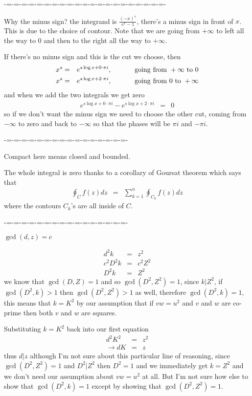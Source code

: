 \documentclass[aps,preprint,preprintnumbers,nofootinbib,showpacs,prd]{revtex4-1}
\newcommand{\nbea}{\begin{eqnarray*}}
\newcommand{\neea}{\end{eqnarray*}}
\begin{document}
-=-=-=-=-=-=-=-=-=-=-=-=-=-=-=-=-=-=-=-=-=-

Why the minus sign? the integrand is $\frac{(-x)^s}{e^x - 1}$, there's a minus sign in front of $x$. This is due to the choice of contour. Note that we are going from $+\infty$ to left all the way to 0 and then to the right all the way to $+\infty$.

If there's no minus sign and this is the cut we choose, then
%
\nbea
x^s & = & e^{s\log x + 0\cdot\pi i} , ~~~~~~~~~~ {\rm going~from~} +\infty {\rm ~to~} 0 \\
x^s & = & e^{s\log x + 2\cdot\pi i} , ~~~~~~~~~~ {\rm going~from~} 0 {\rm ~to~} +\infty
\neea
% 
and when we add the two integrals we get zero
%
\nbea
e^{s\log x + 0\cdot\pi i} - e^{s\log x + 2\cdot\pi i} & = & 0
\neea
%
so if we don't want the minus sign we need to choose the other cut, coming from $-\infty$ to zero and back to $-\infty$ so that the phases will be $\pi i$ and $-\pi i$.

-=-=-=-=-=-=-=-=-=-=-=-=-=-=-=-=-

Compact here means closed and bounded.

The whole integral is zero thanks to a corollary of Goursat theorem which says that
%
\nbea
\oint_C f(z) dz & = & \sum_{k=1}^n \oint_{C_k} f(z) dz
\neea
%
where the contours $C_k$'s are all inside of $C$.


-=-=-=-=-=-=-=-=-=-=-=-=-=-=-=-=-

$\gcd(d,z) = c$

%
\nbea
d^2 k & = & z^2 \\
c^2 D^2 k & = & c^2 Z^2 \\
D^2 k & = & Z^2
\neea
%
we know that $\gcd(D,Z) = 1$ and so $\gcd(D^2,Z^2) = 1$, since $k|Z^2$, if $\gcd(D^2,k) > 1$ then $\gcd(D^2,Z^2) > 1$ as well, therefore $\gcd(D^2,k) = 1$, this means that $k = K^2$ by our assumption that if $vw = u^2$ and $v$ and $w$ are co-prime then both $v$ and $w$ are squares.

Substituting $k=K^2$ back into our first equation
%
\nbea
d^2K^2 & = & z^2 \\
\to dK & = & z
\neea
%
thus $d|z$ although I'm not sure about this particular line of reasoning, since $\gcd(D^2,Z^2) = 1$ and $D^2|Z^2$ then $D^2 = 1$ and we immediately get $k=Z^2$ and we don't need our assumption about $vw=u^2$ at all. But I'm not sure how else to show that $\gcd(D^2,k) = 1$ except by showing that $\gcd(D^2,Z^2) = 1$.
\end{document}
